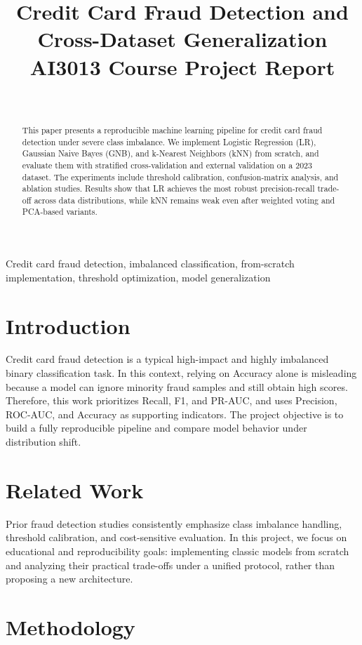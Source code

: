 \documentclass[conference]{IEEEtran}
\title{Credit Card Fraud Detection and Cross-Dataset Generalization\\
\large AI3013 Course Project Report}
\author{
    \IEEEauthorblockN{Group 7}\vspace{0.2cm}\\
    \IEEEauthorblockA{
        \begin{tabular}{lc}
            Heran YANG & 2430034085 \\
            Haoyang JING & 2430034034 \\
            Jiyan LUO & 2430034045 \\
            Yifei SUN & 2430034061 \\
            Sirui ZHU & 2430034102 \\
        \end{tabular}
    }
}
\begin{document}
\maketitle

\begin{abstract}
This paper presents a reproducible machine learning pipeline for credit card fraud detection under severe class imbalance. We implement Logistic Regression (LR), Gaussian Naive Bayes (GNB), and k-Nearest Neighbors (kNN) from scratch, and evaluate them with stratified cross-validation and external validation on a 2023 dataset. The experiments include threshold calibration, confusion-matrix analysis, and ablation studies. Results show that LR achieves the most robust precision-recall trade-off across data distributions, while kNN remains weak even after weighted voting and PCA-based variants.
\end{abstract}

\begin{IEEEkeywords}
Credit card fraud detection, imbalanced classification, from-scratch implementation, threshold optimization, model generalization
\end{IEEEkeywords}

\section{Introduction}
Credit card fraud detection is a typical high-impact and highly imbalanced binary classification task. In this context, relying on Accuracy alone is misleading because a model can ignore minority fraud samples and still obtain high scores. Therefore, this work prioritizes Recall, F1, and PR-AUC, and uses Precision, ROC-AUC, and Accuracy as supporting indicators. The project objective is to build a fully reproducible pipeline and compare model behavior under distribution shift.

\section{Related Work}
Prior fraud detection studies consistently emphasize class imbalance handling, threshold calibration, and cost-sensitive evaluation. In this project, we focus on educational and reproducibility goals: implementing classic models from scratch and analyzing their practical trade-offs under a unified protocol, rather than proposing a new architecture.

\section{Methodology}
\end{document}
